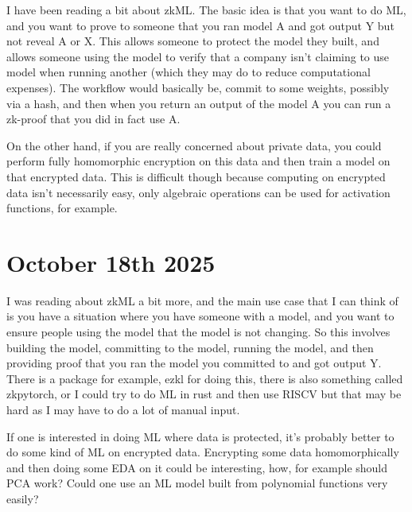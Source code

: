\documentclass{amsart}
\theoremstyle{definition}
\begin{document}
I have been reading a bit about zkML. The basic idea is that you want to do ML, and you want to prove to someone that you ran model A and got output Y but not reveal A or X. This allows someone to protect the model they built, and allows someone using the model to verify that a company isn't claiming to use model when running another (which they may do to reduce computational expenses). The workflow would basically be, commit to some weights, possibly via a hash, and then when you return an output of the model A you can run a zk-proof that you did in fact use A.

On the other hand, if you are really concerned about private data, you could perform fully homomorphic encryption on this data and then train a model on that encrypted data. This is difficult though because computing on encrypted data isn't necessarily easy, only algebraic operations can be used for activation functions, for example.

\section{October 18th 2025}

I was reading about zkML a bit more, and the main use case that I can think of is you have a situation where you have someone with a model, and you want to ensure people using the model that the model is not changing. So this involves building the model, committing to the model, running the model, and then providing proof that you ran the model you committed to and got output Y. There is a package for example, ezkl for doing this, there is also something called zkpytorch, or I could try to do ML in rust and then use RISCV but that may be hard as I may have to do a lot of manual input.

If one is interested in doing ML where data is protected, it's probably better to do some kind of ML on encrypted data. Encrypting some data homomorphically and then doing some EDA on it could be interesting, how, for example should PCA work? Could one use an ML model built from polynomial functions very easily?


\nocite{*}

{}
\end{document}
